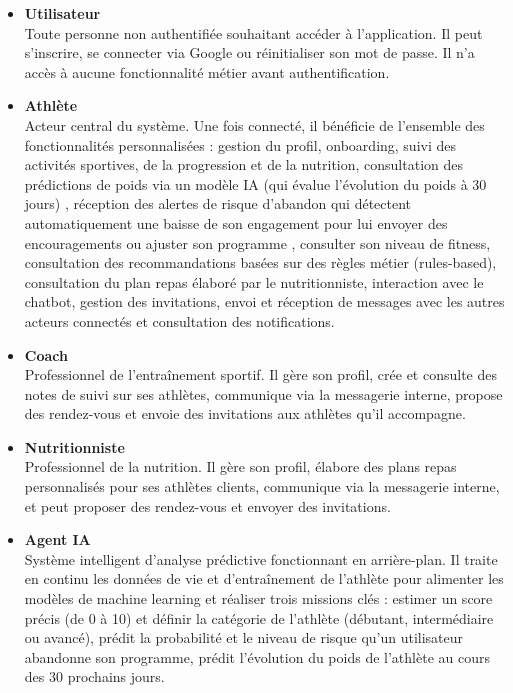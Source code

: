\documentclass[a4paper,12pt]{report}
\begin{document}
\begin{itemize}
    \item \textbf{Utilisateur} \\
      Toute personne non authentifiée souhaitant accéder à l'application. 
    Il peut s'inscrire, se connecter via Google ou réinitialiser son mot de passe. 
    Il n'a accès à aucune fonctionnalité métier avant authentification.

    \item \textbf{Athlète}  \\
     Acteur central du système. Une fois connecté, il bénéficie de l’ensemble des fonctionnalités personnalisées :
     gestion du profil, onboarding, suivi des activités sportives, de la progression et de la nutrition,  consultation des prédictions de poids via un modèle IA (qui évalue l'évolution du poids à 30 jours) ,  réception des alertes de risque d'abandon qui détectent automatiquement une baisse de son engagement pour lui envoyer des encouragements ou ajuster son programme , 
     consulter son niveau de fitness, 
     consultation des recommandations basées sur des règles métier (rules-based), consultation du plan repas élaboré par le nutritionniste,
      interaction avec le chatbot, gestion des invitations, envoi et réception de messages avec les autres acteurs connectés et consultation des notifications.

    \item \textbf{Coach} \\
    Professionnel de l'entraînement sportif. Il gère son profil, 
    crée et consulte des notes de suivi sur ses athlètes, communique via la messagerie interne, 
    propose des rendez-vous et envoie des invitations aux athlètes qu'il accompagne.

    \item \textbf{Nutritionniste} \\
    Professionnel de la nutrition. Il gère son profil, 
    élabore des plans repas personnalisés pour ses athlètes clients, communique via la 
    messagerie interne, et peut proposer des rendez-vous et envoyer des invitations.
    \item \textbf{Agent IA} \\
Système intelligent d'analyse prédictive fonctionnant en arrière-plan. Il traite en continu les données de vie et d'entraînement de l'athlète pour alimenter les modèles de machine learning et réaliser trois missions clés :
estimer un score précis (de 0 à 10) et définir la catégorie de l'athlète (débutant, intermédiaire ou avancé), prédit la probabilité et le niveau de risque qu'un utilisateur abandonne son programme, prédit l’évolution du poids de l’athlète au cours des 30 prochains jours.
   
\end{itemize}
\end{document}
